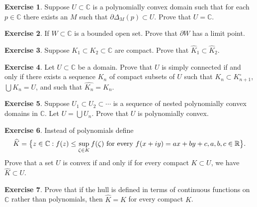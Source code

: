 \documentclass[12pt,openany]{book}
\newcommand{\avoidbreak}{\postdisplaypenalty=100}
\newcommand{\C}{{\mathbb{C}}}
\newcommand{\R}{{\mathbb{R}}}
\theoremstyle{plain}
\theoremstyle{remark}
\theoremstyle{definition}
\newenvironment{exbox}{%
    \def\FrameCommand{\vrule width 1pt \relax\hspace{10pt}}%
    \MakeFramed{\advance\hsize-\width\FrameRestore}%
}{%
    \endMakeFramed
}
\theoremstyle{exercise}
\newtheorem{exercise}{Exercise}[section]
\theoremstyle{example}
\begin{document}
\begin{exbox}
\begin{exercise}
Suppose $U \subset \C$ is a polynomially convex domain such that for each
$p \in \C$ there exists an $M$ such that $\partial \Delta_M(p) \subset U$.
Prove that $U = \C$.
\end{exercise}

\begin{exercise}
If $W \subset \C$ is a bounded open set.  Prove that $\partial W$ has a
limit point.
\end{exercise}

\begin{exercise}
Suppose $K_1 \subset K_2 \subset \C$ are compact.  Prove that
$\widehat{K}_1 \subset \widehat{K}_2$.
\end{exercise}

\begin{exercise}
Let $U \subset \C$ be a domain.  Prove that $U$
is simply connected if and only if there exists a sequence $K_n$
of compact subsets of $U$ such that $K_n \subset K^\circ_{n+1}$,
$\bigcup K_n = U$, and such that $\widehat{K_n} = K_n$.
\end{exercise}

\begin{exercise}
Suppose $U_1 \subset U_2 \subset \cdots$ is a sequence
of nested polynomially convex domains in $\C$.  Let $U = \bigcup U_n$.
Prove that $U$ is polynomially convex.
\end{exercise}

\begin{exercise}
Instead of polynomials define
\begin{equation*}
\widehat{K} = \bigl\{ z \in \C : f(z) \leq \sup_{\zeta \in K}
f(\zeta) \text{ for every } f(x+iy) = ax+by + c, 
a,b,c \in \R
\bigr\}.
\avoidbreak
\end{equation*}
Prove that a set $U$ is convex if and only
if for every compact $K \subset U$, we have $\widehat{K} \subset U$.
\end{exercise}

\begin{exercise}
Prove that if the hull is defined in terms of continuous functions on $\C$
rather than polynomials, then $\widehat{K} = K$ for every compact $K$.
\end{exercise}
\end{exbox}

\end{document}
